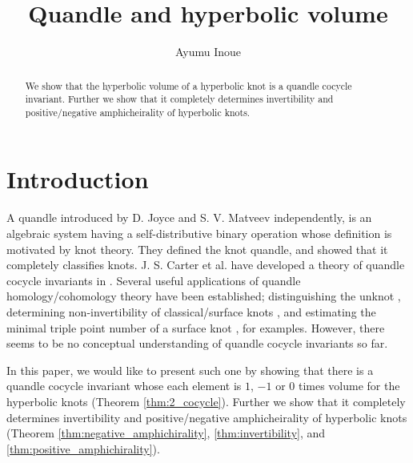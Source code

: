 \documentclass[12pt]{amsart}
\theoremstyle{definition}
\begin{document}
\title[Quandle and hyperbolic volume]{Quandle and hyperbolic volume}
\author{Ayumu Inoue}
\address{Department of Mathematics, Tokyo Institute of Technology, Oh--okayama, Meguro--ku, Tokyo, 152--8551 Japan}


\begin{abstract}
We show that the hyperbolic volume of a hyperbolic knot is a quandle cocycle invariant.
Further we show that it completely determines invertibility and positive/negative amphicheirality of hyperbolic knots.
\end{abstract}

\maketitle

\section{Introduction}\label{sec:introduction}

A quandle introduced by D. Joyce \cite{Joyce1} and S. V. Matveev \cite{Matveev1} independently, is an algebraic system having a self-distributive binary operation whose definition is motivated by knot theory.
They defined the knot quandle, and showed that it completely classifies knots.
J. S. Carter et al. have developed a theory of quandle cocycle invariants in \cite{CJKLS1}.
Several useful applications of quandle homology/cohomology theory have been established; distinguishing the unknot \cite{Eisermann1}, determining non-invertibility of classical/surface knots \cite{CJKLS1, RS1, Satoh1}, and estimating the minimal triple point number of a surface knot \cite{SS1}, for examples.
However, there seems to be no conceptual understanding of quandle cocycle invariants so far.

In this paper, we would like to present such one by showing that there is a quandle cocycle invariant whose each element is $1$, $-1$ or $0$ times volume for the hyperbolic knots (Theorem \ref{thm:2_cocycle}).
Further we show that it completely determines invertibility and positive/negative amphicheirality of hyperbolic knots (Theorem \ref{thm:negative_amphichirality}, \ref{thm:invertibility}, and \ref{thm:positive_amphichirality}).
\end{document}
